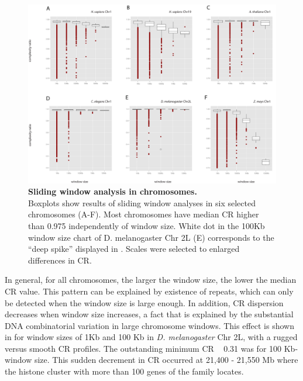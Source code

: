 \begin{figure}[htpb] 
\centering 
\includegraphics[width=\textwidth]{tex_source/figures/dna_struct/box_complexity_windows.png}
\caption[Sliding window analysis in chromosomes]{{\bf Sliding window analysis in chromosomes.} \\Boxplots show results of sliding window analyses in six selected chromosomes (A-F). Most chromosomes have median CR higher than 0.975 independently of window size. White dot in the 100Kb window size chart of D. melanogaster Chr 2L (E) corresponds to the ``deep spike'' displayed in . Scales were selected to enlarged differences in CR.
}
\label{fig:box_compl}
\end{figure}


In general, for all chromosomes, the larger the window size, the lower the median CR value. This pattern can be explained by existence of repeats, which can only be detected when the window size is large enough. In addition, CR dispersion decreases when window size increases, a fact that is explained by the substantial DNA combinatorial variation in large chromosome windows. This effect is shown in  for window sizes of 1Kb and 100 Kb in \textit{D. melanogaster} Chr 2L, with a rugged versus smooth CR profiles. The outstanding
minimum CR ~ 0.31 was for 100 Kb-window size. This sudden decrement in CR occurred at 21,400 - 21,550 Mb where the histone cluster with more than 100 genes of the family locates.


